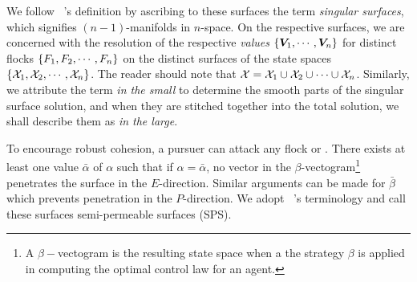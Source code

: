 We follow ~\cite{Isaacs1965}'s definition by ascribing to these surfaces the term \textit{singular surfaces}, which signifies $(n-1)$-manifolds in $n$-space.  On the respective surfaces, we are concerned with the resolution of the respective \textit{values} \ie  $\{\bm{V}_1, \cdots, \bm{V}_n\}$  for distinct flocks $\{F_1, F_2, \cdots, F_n\}$ on the distinct surfaces of the state spaces $\{\mathcal{X}_1, \mathcal{X}_2, \cdots, \mathcal{X}_n\}$. The reader should note that $\mathcal{X} = \mathcal{X}_1 \cup \mathcal{X}_2 \cup \cdots \cup \mathcal{X}_n$. %
Similarly, we  attribute the term \textit{in the small} to determine the smooth parts of the singular surface solution, and when they are stitched together into the total solution, we shall describe them as \textit{in the large}. 


To encourage robust cohesion, a pursuer can attack any flock or . %
There exists at least one value $\bar{\alpha}$ of $\alpha$ such that if $\alpha = \bar{\alpha}$, no vector in the $\beta$-vectogram\footnote{A $\beta-$vectogram is the resulting state space when a the strategy $\beta$ is applied in computing the optimal control law for an agent.} penetrates the surface in the $E$-direction. Similar arguments can be made for $\bar{\beta}$ which prevents penetration in the $P$-direction. We adopt ~\cite{Isaacs1965}'s terminology and call these surfaces semi-permeable surfaces (SPS).



